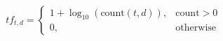 \documentclass[preview]{standalone}
\begin{document}
\begin{align*}
tf_{t,d} = \begin{cases}1+\log_{10}(\text{count}(t,d)),&\text{count}>0\\[4pt]0,&\text{otherwise}\end{cases}
\end{align*}
\end{document}
